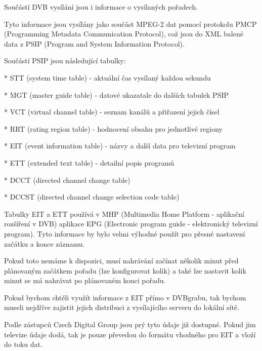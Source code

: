 Součástí DVB vysílání jsou i informace o vysílaných pořadech.

Tyto informace jsou vysílány jako součást MPEG-2 dat pomocí protokolu PMCP (Programming Metadata Communication Protocol), což jsou do XML balené data z PSIP (Program and System Information Protocol).

\vspace{10pt}

Součástí PSIP jsou následující tabulky:

* STT (system time table) - aktuální čas vysílaný každou sekundu

* MGT (master guide table) - datové ukazatale do dalších tabulek PSIP

* VCT (virtual channel table) - seznam kanálů a přiřazení jejich čísel

* RRT (rating region table) - hodnocení obsahu pro jednotlivé regiony

* EIT (event information table) - názvy a další data pro televizní program

* ETT (extended text table) - detailní popis programů

* DCCT (directed channel change table)

* DCCST (directed channel change selection code table)

\vspace{10pt}

Tabulky EIT a ETT používá v MHP (Multimedia Home Platform - aplikační rozšíření v DVB) aplikace EPG (Electronic program guide - elektronický televizní program). Tyto informace by bylo velmi výhodné použít pro přesné nastavení začátku a konce záznamu.

\vspace{10pt}

Pokud toto nemáme k dispozici, musí nahrávání začínat několik minut před plánovaným začátkem pořadu (lze konfigurovat kolik) a také lze nastavit kolik minut se má nahrávat po plánovaném konci pořadu.

\vspace{10pt}

Pokud bychom chtěli využít informace z EIT přímo v DVBgrabu, tak bychom museli nejdříve zajistit jejich distribuci z vysílajícího serveru do lokální sítě.

\vspace{10pt}

Podle zástupců Czech Digital Group jsou prý tyto údaje již dostupné. Pokud jim televize údaje dodá, tak je pouze převedou do formátu vhodného pro EIT a vloží do toku dat.

